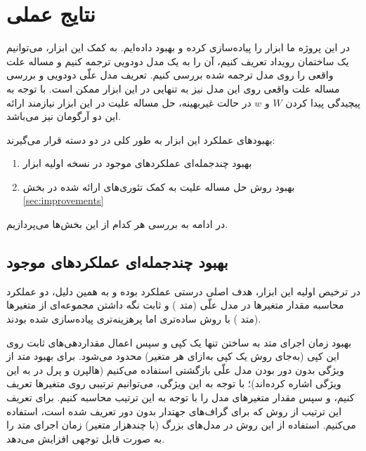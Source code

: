 \section{نتایج عملی}\label{sec:experiments}

در این پروژه ما ابزار
را پیاده‌سازی کرده و بهبود داده‌ایم.
به کمک این ابزار، می‌توانیم یک ساختمان رویداد تعریف کنیم،
آن را به یک مدل دودویی ترجمه کنیم
و مساله علت واقعی را روی مدل ترجمه شده بررسی کنیم.
تعریف مدل علّی دودویی و بررسی مساله علت واقعی 
روی این مدل نیز به تنهایی در این ابزار ممکن است.
با توجه به پیچیدگی پیدا کردن
$W$ و $w$
در حالت غیربهینه، حل مساله علیت در این ابزار
نیازمند ارائه این دو آرگومان نیز می‌باشد.

بهبودهای عملکرد این ابزار به طور کلی
در دو دسته قرار می‌گیرند:

\begin{enumerate}
  \item
    بهبود چندجمله‌ای عملکردهای موجود
    در نسخه اولیه ابزار
  \item
    بهبود روش حل مساله علیت
    به کمک تئوری‌های ارائه شده در بخش
    \ref{sec:improvements}
\end{enumerate}

در ادامه به بررسی هر کدام از این بخش‌ها می‌پردازیم.

\subsection{بهبود چندجمله‌ای عملکردهای موجود}

در ترخیص
اولیه این ابزار،
هدف اصلی درستی عملکرد بوده و به همین دلیل،
دو عملکرد محاسبه مقدار متغیرها در مدل علّی
(متد )
و ثابت نگه داشتن مجموعه‌ای از متغیرها
(متد )
با روش ساده‌تری اما پرهزینه‌تری پیاده‌سازی شده بودند.

بهبود زمان اجرای متد
به ساختن تنها یک کپی و سپس اعمال مقداردهی‌های ثابت
روی این کپی
(به‌جای روش یک کپی به‌ازای هر متغیر)
محدود می‌شود.
برای بهبود متد
از ویژگی بدون دور بودن مدل علّی بازگشتی استفاده می‌کنیم
(هالپرن و پرل در
\cite{halpern2001causes}
به این ویژگی اشاره کرده‌اند)؛
با توجه به این ویژگی، می‌توانیم ترتیبی روی متغیرها
تعریف کنیم، و سپس مقدار متغیرهای مدل را
با توجه به این ترتیب محاسبه کنیم.
برای تعریف این ترتیب از روش
که برای گراف‌های جهتدار بدون دور تعریف شده است، استفاده می‌کنیم.
استفاده از این روش در مدل‌های بزرگ
(با چندهزار متغیر)
زمان اجرای متد
را به صورت قابل توجهی افزایش می‌دهد.

